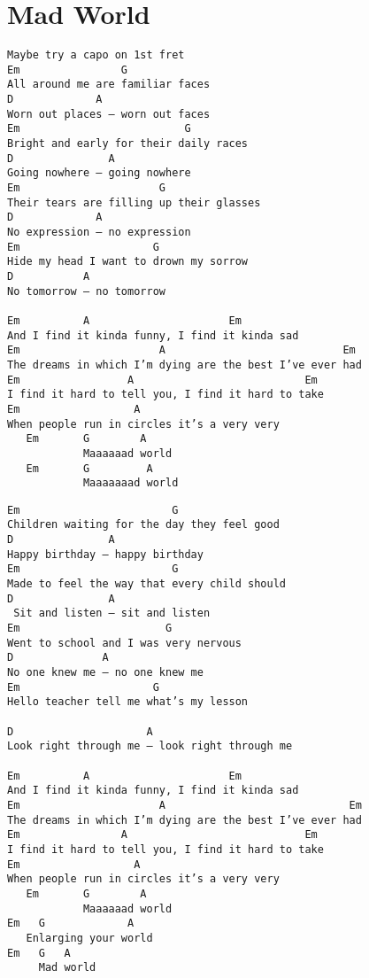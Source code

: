 \documentclass[leqno]{memoir}
\begin{document}
\chapter{Mad World}
\begin{verbatim}
Maybe try a capo on 1st fret
Em                G
All around me are familiar faces 
D             A
Worn out places – worn out faces 
Em                          G
Bright and early for their daily races 
D               A
Going nowhere – going nowhere 
Em                      G
Their tears are filling up their glasses 
D             A
No expression – no expression 
Em                     G
Hide my head I want to drown my sorrow 
D           A
No tomorrow – no tomorrow 

Em          A                      Em
And I find it kinda funny, I find it kinda sad 
Em                      A                            Em
The dreams in which I’m dying are the best I’ve ever had 
Em                 A                           Em
I find it hard to tell you, I find it hard to take 
Em                  A
When people run in circles it’s a very very 
   Em       G        A
            Maaaaaad world 
   Em       G         A
            Maaaaaaad world 

\end{verbatim}
\newpage
\begin{verbatim}
Em                        G
Children waiting for the day they feel good 
D               A
Happy birthday – happy birthday 
Em                        G
Made to feel the way that every child should 
D               A
 Sit and listen – sit and listen 
Em                       G
Went to school and I was very nervous 
D              A
No one knew me – no one knew me 
Em                     G
Hello teacher tell me what’s my lesson 

D                     A
Look right through me – look right through me 

Em          A                      Em
And I find it kinda funny, I find it kinda sad 
Em                      A                             Em
The dreams in which I’m dying are the best I’ve ever had 
Em                A                            Em
I find it hard to tell you, I find it hard to take 
Em                  A
When people run in circles it’s a very very 
   Em       G        A
            Maaaaaad world 
Em   G             A
   Enlarging your world 
Em   G   A
     Mad world
\end{verbatim}
\newpage
\end{document}
